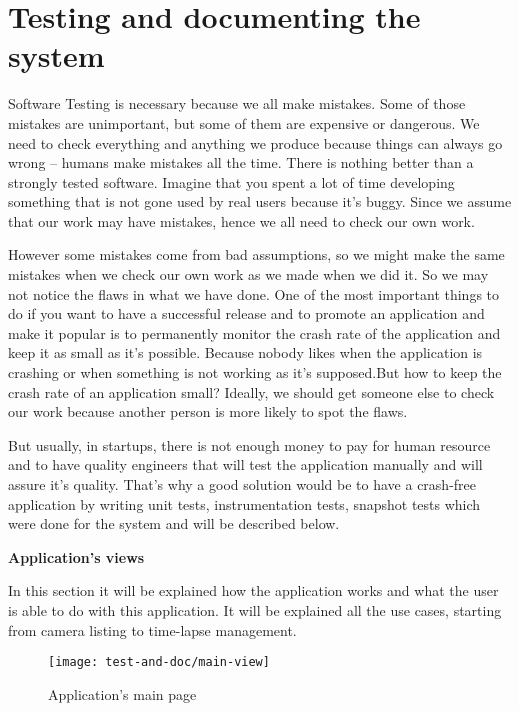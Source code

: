 \section{Testing and documenting the system}


Software Testing is necessary because we all make mistakes. Some of those mistakes are unimportant, but some of them are expensive or dangerous.   We need to check everything and anything we produce because things can always go wrong – humans make mistakes all the time.  There is nothing better than a strongly tested software.  Imagine that you spent a lot of time developing something that is not gone used by real users because it’s buggy.  Since we assume that our work may have mistakes, hence we all need to check our own work.\vspace{0.3cm}

However some mistakes come from bad assumptions, so we might make the same mistakes when we check our own work as we made when we did it. So we may not notice the flaws in what we have done. One of the most important things to do if you want to have a successful release and to promote an application and make it popular is to permanently monitor the crash rate of the application and keep it as small as it’s possible.  Because nobody likes when the application is crashing or when something is not working as it’s supposed.But how to keep the crash rate of an application small? Ideally, we should get someone else to check our work because another person is more likely to spot the flaws. \cite{unit-test} \vspace{0.3cm}

But usually, in startups, there is not enough money to pay for human resource and to have quality engineers that will test the application manually and will assure it’s quality. That’s why a good solution would be to have a crash-free application by writing unit tests, instrumentation tests, snapshot tests which were done for the system and will be described below.\vspace{0.3cm}

\textbf{Application's views}

In this section it will be explained how the application works and what the user is able to do with this application. It will be explained all the use cases, starting from camera listing to time-lapse management.

\vspace{0.3cm}
\begin{figure}[!ht]
   \centering
   \texttt{[image: test-and-doc/main-view]}
   \caption{Application's main page}\label{app-main-view}
\end{figure}

